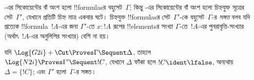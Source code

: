 \documentclass[../../../include/open-logic-section]{subfiles}
\begin{document}


-এর সিকোয়েন্টের বাঁ অংশ হলো
!!{formula}sর বহুসেট~$\Gamma$; কিন্তু
-এর সিকোয়েন্টের বাঁ অংশ হলো
চিহ্নযুক্ত সূত্রের সেট~$\Gamma'$, যেখানে
প্রতিটি চিহ্ন মাত্র একবার ঘটে। চিহ্নযুক্ত
!!{formula}sর সেট~$\Gamma'$-কে বহুসেট~$\Gamma$-র
\emph{সঙ্গত} বলব যদি প্রত্যেক !!{formula}~$!A$-এর
জন্য $\Gamma'$-তে $x : !A$ রূপের !!{element}sর
সংখ্যা $\Gamma$-তে~$!A$-এর পুনরাবৃত্তি-সংখ্যার
(অর্থাৎ~$!A$-এর অনুলিপির সংখ্যার) বেশি না হয়।

\begin{prop}
যদি $\Log{G2i} + \Cut \Proves \Gamma \Sequent \Delta$,
তাহলে $\Log{N2i} \Proves \Gamma' \Sequent !C$,
যেখানে $\Delta$ ফাঁকা হলে $!C \ident \lfalse$,
অন্যথায় $\Delta = \{!C\}$; এবং $\Gamma'$
হলো~$\Gamma$-র সঙ্গত।
\end{prop}
\end{document}
